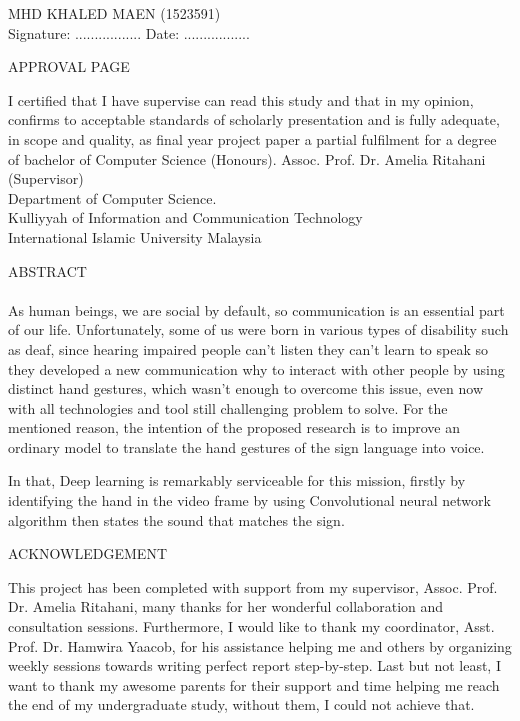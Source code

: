\documentclass[12pt]{report}
\begin{document}
    \mbox{}
    \vfill
    MHD KHALED MAEN (1523591) \\
    \bigbreak
    Signature: ................. \quad \quad \quad \quad Date: .................
    \bigbreak

    \newpage
    \begin{center}
        \LARGE APPROVAL PAGE
    \end{center}  
    I certified that I have supervise can read this study and that in my opinion,
    confirms to acceptable standards of scholarly presentation and is fully adequate,
    in scope and quality, as final year project paper a partial fulfilment for a 
    degree of bachelor of Computer Science (Honours).
    \mbox{}
    \vfill
    Assoc. Prof. Dr. Amelia Ritahani (Supervisor)\\
    \bigbreak
    Department of Computer Science.\\
    \bigbreak
    Kulliyyah of Information and Communication Technology\\
    \bigbreak
    International Islamic University Malaysia
    \bigbreak

    \newpage

     \begin{center}
        \LARGE ABSTRACT
    \end{center}
    \paragraph{}
        As human beings, we are social by default, so communication is an essential part of our life.
        Unfortunately, some of us were born in various types of disability such as deaf,
        since hearing impaired people can't listen they can't learn to speak so they developed 
        a new communication why to interact with other people by using distinct hand gestures, 
        which wasn't enough to overcome this issue, even now with all technologies and tool still challenging problem to solve.
        For the mentioned reason, 
        the intention of the proposed research is to improve an ordinary model to translate the hand gestures of the sign language into voice.
        
        In that, Deep learning is remarkably serviceable for this mission, 
        firstly by identifying the hand in the video frame by using Convolutional
        neural network algorithm then states the sound that matches the sign.
    

    \newpage
    \begin{center}
        \LARGE ACKNOWLEDGEMENT
    \end{center}  
    This project has been completed with support from my supervisor, Assoc. Prof. Dr. Amelia Ritahani, many thanks for her wonderful 
    collaboration and consultation sessions. Furthermore, 
    I would like to thank my coordinator, Asst. Prof. Dr. Hamwira Yaacob, for his 
    assistance helping me and others by organizing weekly sessions towards writing perfect report step-by-step. 
    Last but not least,
    I want to thank my awesome parents for their support and time helping me reach the end of my undergraduate study, without them, I could not achieve that.
\end{document}
